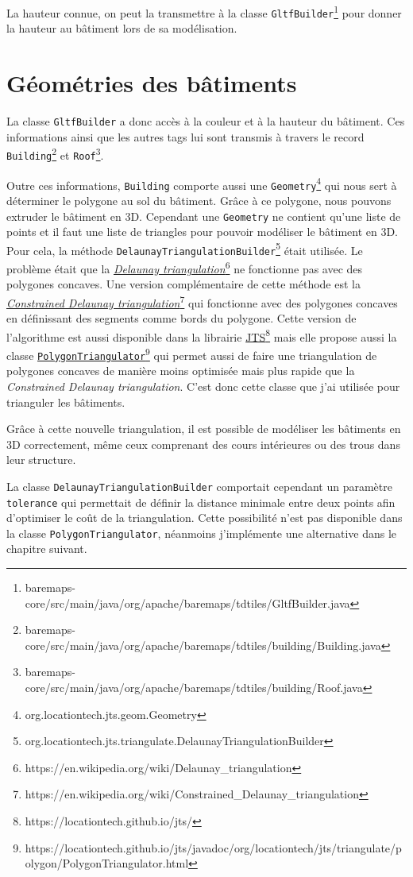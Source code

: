 La hauteur connue, on peut la transmettre à la classe \texttt{GltfBuilder}\footnote{baremaps-core/src/main/java/org/apache/baremaps/tdtiles/GltfBuilder.java} pour donner la hauteur au bâtiment lors de sa modélisation.

\newpage

\section{Géométries des bâtiments}

La classe \texttt{GltfBuilder} a donc accès à la couleur et à la hauteur du bâtiment. Ces informations ainsi que les autres tags lui sont transmis à travers le record \texttt{Building}\footnote{baremaps-core/src/main/java/org/apache/baremaps/tdtiles/building/Building.java} et \texttt{Roof}\footnote{baremaps-core/src/main/java/org/apache/baremaps/tdtiles/building/Roof.java}.

Outre ces informations, \texttt{Building} comporte aussi une \texttt{Geometry}\footnote{org.locationtech.jts.geom.Geometry} qui nous sert à déterminer le polygone au sol du bâtiment. Grâce à ce polygone, nous pouvons extruder le bâtiment en 3D. Cependant une \texttt{Geometry} ne contient qu'une liste de points et il faut une liste de triangles pour pouvoir modéliser le bâtiment en 3D. Pour cela, la méthode \texttt{DelaunayTriangulationBuilder}\footnote{org.locationtech.jts.triangulate.DelaunayTriangulationBuilder} était utilisée. Le problème était que la \href{https://en.wikipedia.org/wiki/Delaunay_triangulation}{\textit{Delaunay triangulation}}\footnote{https://en.wikipedia.org/wiki/Delaunay\_triangulation} ne fonctionne pas avec des polygones concaves. Une version complémentaire de cette méthode est la \href{https://en.wikipedia.org/wiki/Constrained_Delaunay_triangulation}{\textit{Constrained Delaunay triangulation}}\footnote{https://en.wikipedia.org/wiki/Constrained\_Delaunay\_triangulation} qui fonctionne avec des polygones concaves en définissant des segments comme bords du polygone. Cette version de l'algorithme est aussi disponible dans la librairie \href{https://locationtech.github.io/jts/}{JTS}\footnote{https://locationtech.github.io/jts/} mais elle propose aussi la classe \href{https://locationtech.github.io/jts/javadoc/org/locationtech/jts/triangulate/polygon/PolygonTriangulator.html}{\texttt{PolygonTriangulator}}\footnote{https://locationtech.github.io/jts/javadoc/org/locationtech/jts/triangulate/polygon/PolygonTriangulator.html} qui permet aussi de faire une triangulation de polygones concaves de manière moins optimisée mais plus rapide que la \textit{Constrained Delaunay triangulation}. C'est donc cette classe que j'ai utilisée pour trianguler les bâtiments.

Grâce à cette nouvelle triangulation, il est possible de modéliser les bâtiments en 3D correctement, même ceux comprenant des cours intérieures ou des trous dans leur structure.

La classe \texttt{DelaunayTriangulationBuilder} comportait cependant un paramètre \texttt{tolerance} qui permettait de définir la distance minimale entre deux points afin d'optimiser le coût de la triangulation. Cette possibilité n'est pas disponible dans la classe \texttt{PolygonTriangulator}, néanmoins j'implémente une alternative dans le chapitre suivant.